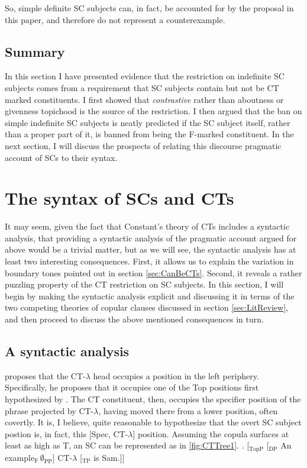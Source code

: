 \documentclass[letterpaper]{article}
\begin{document}
So, simple definite SC subjects can, in fact, be accounted for by the proposal in this paper, and therefore do not represent a counterexample.
\subsection{Summary}
In this section I have presented evidence that the restriction on indefinite SC subjects comes from a requirement that SC subjects contain but not be CT marked constituents.
I first showed that \textit{contrastive} rather than aboutness or givenness topichood is the source of the restriction.
I then argued that the ban on simple indefinite SC subjects is neatly predicted if the SC subject itself, rather than a proper part of it, is banned from being the F-marked constituent.
In the next section, I will discuss the prospects of relating this discourse pragmatic account of SCs to their syntax.
\section{The syntax of SCs and CTs}\label{sec:syntax}
It may seem, given the fact that Constant's theory of CTs includes a syntactic analysis, that providing a syntactic analysis of the pragmatic account argued for above would be a trivial matter, but as we will see, the syntactic analysis has at least two interesting consequences.
First, it allows us to explain the variation in boundary tones pointed out in section \ref{sec:CanBeCTs}.
Second, it reveals a rather puzzling property of the CT restriction on SC subjects.
In this section, I will begin by making the syntactic analysis explicit and discussing it in terms of the two competing theories of copular clauses discussed in section \ref{sec:LitReview}, and then proceed to discuss the above mentioned consequences in turn.

\subsection{A syntactic analysis}
\textcite[124]{constant2014diss} proposes that the CT-$\lambda$ head occupies a position in the left periphery.
Specifically, he proposes that it occupies one of the Top positions first hypothesized by \textcite{rizzi1997fine}.
The CT constituent, then, occupies the specifier position of the phrase projected by CT-$\lambda$, having moved there from a lower position, often covertly.
It is, I believe, quite reasonable to hypothesize that the overt SC subject postion is, in fact, this [Spec, CT-$\lambda$] position.
Assuming the copula surfaces at least as high as T, an SC can be represented as in \ref{fig:CTTree1}.
\ex.\label{fig:CTTree1} [$_\text{TopP}$ [$_\text{DP}$ An example$_\text{F}\,\emptyset_\text{PP}$] CT-$\lambda$ [$_\text{TP}$ is Sam.]]
\end{document}
